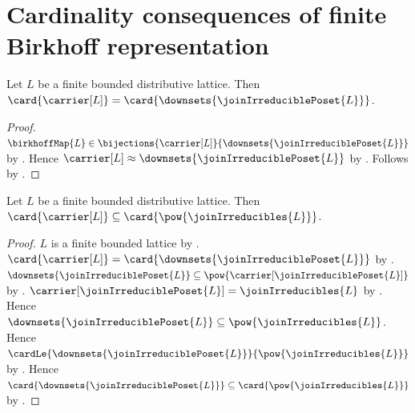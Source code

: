 \section{Cardinality consequences of finite Birkhoff representation}




\begin{theorem}
    \label{finite_distributive_lattice_cardinality_eq_downsets}
    Let $L$ be a finite bounded distributive lattice.
    Then
        $\card{\carrier[L]}
            =\card{\downsets{\joinIrreduciblePoset{L}}}$.
\end{theorem}
\begin{proof}
    $\birkhoffMap{L}\in
        \bijections{\carrier[L]}
            {\downsets{\joinIrreduciblePoset{L}}}$ by
        .
    Hence $\carrier[L]\approx
        \downsets{\joinIrreduciblePoset{L}}$ by
        .
    Follows by .
\end{proof}

\begin{theorem}
    \label{finite_distributive_lattice_cardinality_leq_powerset_join_irreducibles}
    Let $L$ be a finite bounded distributive lattice.
    Then
        $\card{\carrier[L]}
            \subseteq\card{\pow{\joinIrreducibles{L}}}$.
\end{theorem}
\begin{proof}
    $L$ is a finite bounded lattice by
        .
    $\card{\carrier[L]}
        =\card{\downsets{\joinIrreduciblePoset{L}}}$ by
        .
    $\downsets{\joinIrreduciblePoset{L}}
        \subseteq\pow{\carrier[\joinIrreduciblePoset{L}]}$ by
        .
    $\carrier[\joinIrreduciblePoset{L}]
        =\joinIrreducibles{L}$ by
        .
    Hence $\downsets{\joinIrreduciblePoset{L}}
        \subseteq\pow{\joinIrreducibles{L}}$.
    Hence $\cardLe
        {\downsets{\joinIrreduciblePoset{L}}}
        {\pow{\joinIrreducibles{L}}}$ by
        .
    Hence $\card{\downsets{\joinIrreduciblePoset{L}}}
        \subseteq\card{\pow{\joinIrreducibles{L}}}$ by
        .
\end{proof}
